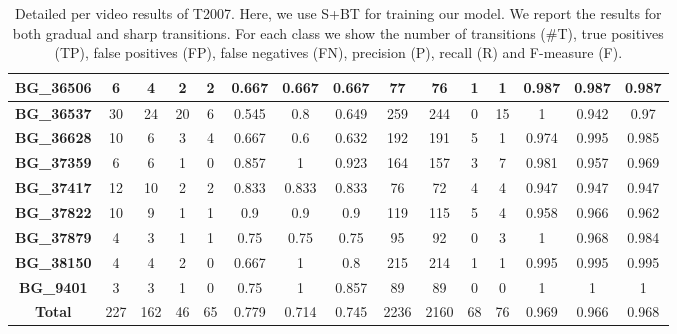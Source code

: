 \documentclass[journal]{IEEEtran}
\begin{document}
\begin{table*}[h]
\begin{tabular}{|c|c|c|c|c|c|c|c|c|c|c|c|c|c|c|}
\textbf{BG\_36506} & 6             & 4           & 2           & 2           & 0.667      & 0.667      & 0.667      & 77            & 76          & 1           & 1           & 0.987      & 0.987      & 0.987      \\ \hline
\textbf{BG\_36537} & 30            & 24          & 20          & 6           & 0.545      & 0.8        & 0.649      & 259           & 244         & 0           & 15          & 1          & 0.942      & 0.97       \\ \hline
\textbf{BG\_36628} & 10            & 6           & 3           & 4           & 0.667      & 0.6        & 0.632      & 192           & 191         & 5           & 1           & 0.974      & 0.995      & 0.985      \\ \hline
\textbf{BG\_37359} & 6             & 6           & 1           & 0           & 0.857      & 1          & 0.923      & 164           & 157         & 3           & 7           & 0.981      & 0.957      & 0.969      \\ \hline
\textbf{BG\_37417} & 12            & 10          & 2           & 2           & 0.833      & 0.833      & 0.833      & 76            & 72          & 4           & 4           & 0.947      & 0.947      & 0.947      \\ \hline
\textbf{BG\_37822} & 10            & 9           & 1           & 1           & 0.9        & 0.9        & 0.9        & 119           & 115         & 5           & 4           & 0.958      & 0.966      & 0.962      \\ \hline
\textbf{BG\_37879} & 4             & 3           & 1           & 1           & 0.75       & 0.75       & 0.75       & 95            & 92          & 0           & 3           & 1          & 0.968      & 0.984      \\ \hline
\textbf{BG\_38150} & 4             & 4           & 2           & 0           & 0.667      & 1          & 0.8        & 215           & 214         & 1           & 1           & 0.995      & 0.995      & 0.995      \\ \hline
\textbf{BG\_9401}  & 3             & 3           & 1           & 0           & 0.75       & 1          & 0.857      & 89            & 89          & 0           & 0           & 1          & 1          & 1          \\ \hline
\textbf{Total}      & 227           & 162         & 46          & 65          & 0.779      & 0.714      & 0.745      & 2236          & 2160        & 68          & 76          & 0.969      & 0.966      & 0.968      \\ \hline
\end{tabular}
\caption{Detailed per video results of T2007. Here, we use S+BT for training our model. We report the results for both gradual and sharp transitions. For each class we show the number of transitions (\#T), true positives (TP), false positives (FP), false negatives (FN), precision (P), recall (R) and F-measure (F).}
\label{2007_01}
\end{table*}
\end{document}
